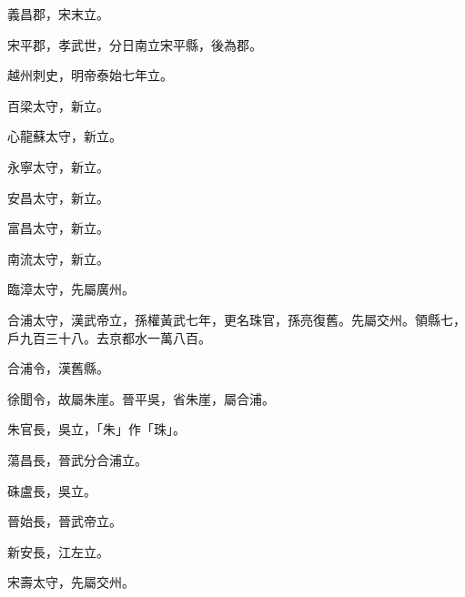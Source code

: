 \begin{pinyinscope}
 義昌郡，宋末立。



 宋平郡，孝武世，分日南立宋平縣，後為郡。



 越州刺史，明帝泰始七年立。



 百梁太守，新立。



 心龍蘇太守，新立。



 永寧太守，新立。



 安昌太守，新立。



 富昌太守，新立。



 南流太守，新立。



 臨漳太守，先屬廣州。



 合浦太守，漢武帝立，孫權黃武七年，更名珠官，孫亮復舊。先屬交州。領縣七，戶九百三十八。去京都水一萬八百。



 合浦令，漢舊縣。



 徐聞令，故屬朱崖。晉平吳，省朱崖，屬合浦。



 朱官長，吳立，「朱」作「珠」。



 蕩昌長，晉武分合浦立。



 硃盧長，吳立。



 晉始長，晉武帝立。



 新安長，江左立。



 宋壽太守，先屬交州。



\end{pinyinscope}